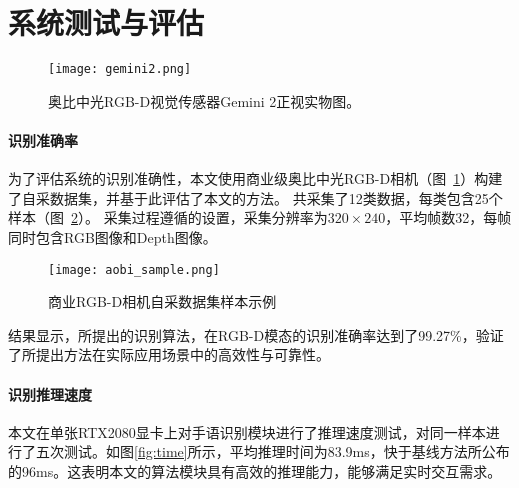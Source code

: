 \section{系统测试与评估}
\begin{figure}
    \centering
    \texttt{[image: gemini2.png]}
    \caption{奥比中光RGB-D视觉传感器Gemini 2正视实物图。}
    \label{fig:aobi_robot}
  \end{figure}
\paragraph{识别准确率}
为了评估系统的识别准确性，本文使用商业级奥比中光RGB-D相机（图~\ref{fig:aobi_robot}）构建了自采数据集，并基于此评估了本文的方法。%
共采集了12类数据，每类包含25个样本（图~\ref{fig:aobi_sample}）。%
采集过程遵循\cite{wan2016chalearn}的设置，采集分辨率为$320\times240$，平均帧数32，每帧同时包含RGB图像和Depth图像。

\begin{figure}
    \centering
    \texttt{[image: aobi\_sample.png]}
    \caption{商业RGB-D相机自采数据集样本示例}
    \label{fig:aobi_sample}
  \end{figure}

结果显示，所提出的识别算法，在RGB-D模态的识别准确率达到了99.27\%，验证了所提出方法在实际应用场景中的高效性与可靠性。

\paragraph{识别推理速度}
本文在单张RTX2080显卡上对手语识别模块进行了推理速度测试，对同一样本进行了五次测试。如图\ref{fig:time}所示，平均推理时间为83.9ms，快于基线方法\cite{范桂双2020基于S3D}所公布的96ms。这表明本文的算法模块具有高效的推理能力，能够满足实时交互需求。

